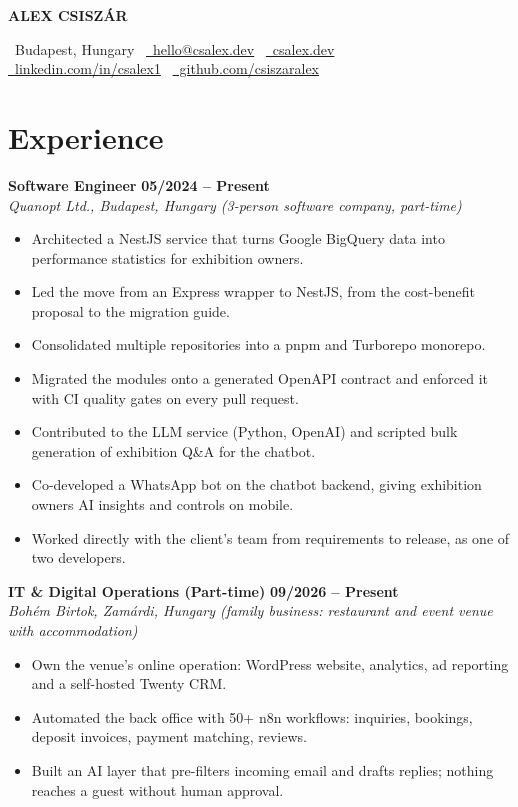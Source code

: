 \documentclass[10pt, a4paper]{article}
\newcommand{\cventry}[3]{
    {\large\bfseries\color{AccentColor}#1}
    \hfill
    {\large\bfseries\color{AccentColor}#3} \\
    \textit{#2}
    \vspace{2pt}
}
\begin{document}
\begin{center}
    {\Huge\bfseries ALEX CSISZÁR}
    \vspace{1ex} %

    \faMapMarker\ Budapest, Hungary \textperiodcentered\
    \href{mailto:hello@csalex.dev}{\faEnvelope\ hello@csalex.dev} \textperiodcentered\
    \href{https://csalex.dev}{\faGlobe\ csalex.dev} \\
    \vspace{0.5ex}
    \href{https://linkedin.com/in/csalex1}{\faLinkedin\ linkedin.com/in/csalex1} \textperiodcentered\
    \href{https://github.com/csiszaralex}{\faGithub\ github.com/csiszaralex}
\end{center}

\section*{Experience}

\cventry{Software Engineer}{Quanopt Ltd., Budapest, Hungary (3-person software company, part-time)}{05/2024 – Present}
\begin{itemize}
    \item Architected a NestJS service that turns Google BigQuery data into performance statistics for exhibition owners.
    \item Led the move from an Express wrapper to NestJS, from the cost-benefit proposal to the migration guide.
    \item Consolidated multiple repositories into a pnpm and Turborepo monorepo.
    \item Migrated the modules onto a generated OpenAPI contract and enforced it with CI quality gates on every pull request.
    \item Contributed to the LLM service (Python, OpenAI) and scripted bulk generation of exhibition Q\&A for the chatbot.
    \item Co-developed a WhatsApp bot on the chatbot backend, giving exhibition owners AI insights and controls on mobile.
    \item Worked directly with the client's team from requirements to release, as one of two developers.
\end{itemize}
\vspace{0.6ex} %

\cventry{IT \& Digital Operations (Part-time)}{Bohém Birtok, Zamárdi, Hungary (family business: restaurant and event venue with accommodation)}{09/2026 – Present}
\begin{itemize}
    \item Own the venue's online operation: WordPress website, analytics, ad reporting and a self-hosted Twenty CRM.
    \item Automated the back office with 50+ n8n workflows: inquiries, bookings, deposit invoices, payment matching, reviews.
    \item Built an AI layer that pre-filters incoming email and drafts replies; nothing reaches a guest without human approval.
\end{itemize}
\end{document}
